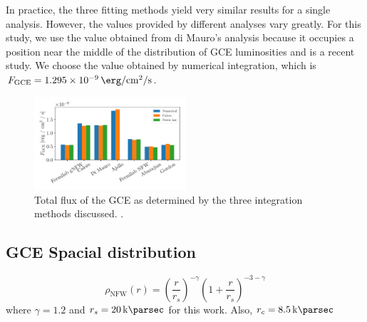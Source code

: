 \documentclass[a4paper,11pt]{article}
\newcommand{\parens}[1]{\left(#1\right)}
\newcommand{\comment}[1]{\emph{\color{red}{#1}}}
\begin{document}
In practice, the three fitting methods yield very similar results for a single analysis. However, the values provided by different analyses vary greatly. For this study, we use the value obtained from di Mauro's analysis because it occupies a position near the middle of the distribution of GCE luminosities and is a recent study. We choose the value obtained by numerical integration, which is $F_\text{GCE} = \SI{1.295e-9}{\erg\per\centi\meter\squared\per\second}$.

\comment{Discuss how rescaling of the ROI was done}

\begin{figure}
    \centering
    \includegraphics[width=0.5\textwidth]{figs/total-flux-bars.pdf}
    \caption{Total flux of the GCE as determined by the three integration methods discussed. \comment{Here I would discuss why Ajello doesn't have a value for the power law case if this is still true once I have the original source}.}
    \label{fig:total-flux-bars}
\end{figure}


\comment{Just double check that I normalized the power law correctly in parse\_spectrum.py.}


\subsection{GCE Spacial distribution}
\begin{equation}
    \rho_\text{NFW}(r) = \parens{\frac{r}{r_s}}^{-\gamma}\parens{1 + \frac{r}{r_s}}^{-3-\gamma}
    \label{eqn:nfw}
\end{equation}
where $\gamma = 1.2$ and $r_s = \SI{20}{\kilo\parsec}$ for this work. Also, $r_c = \SI{8.5}{\kilo\parsec}$
\end{document}

